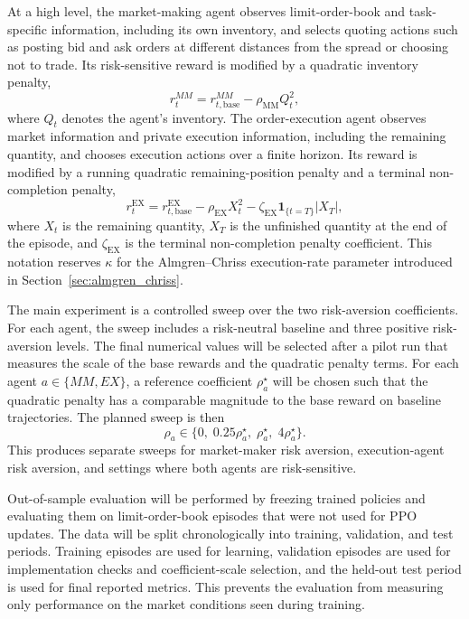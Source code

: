 \documentclass[oneside]{uva-inf-bachelor-thesis}
\begin{document}
At a high level, the market-making agent observes limit-order-book and task-specific information, including its own inventory, and selects quoting actions such as posting bid and ask orders at different distances from the spread or choosing not to trade. Its risk-sensitive reward is modified by a quadratic inventory penalty,
\[
r_t^{MM} = r_{t,\mathrm{base}}^{MM} - \rho_{\mathrm{MM}} Q_t^2,
\]
where \(Q_t\) denotes the agent's inventory. The order-execution agent observes market information and private execution information, including the remaining quantity, and chooses execution actions over a finite horizon. Its reward is modified by a running quadratic remaining-position penalty and a terminal non-completion penalty,
\[
r_t^{\mathrm{EX}}
=
r_{t,\mathrm{base}}^{\mathrm{EX}}
-
\rho_{\mathrm{EX}} X_t^2
-
\zeta_{\mathrm{EX}}\mathbf{1}_{\{t=T\}}|X_T|,
\]
where \(X_t\) is the remaining quantity, \(X_T\) is the unfinished quantity at the end of the episode, and \(\zeta_{\mathrm{EX}}\) is the terminal non-completion penalty coefficient. This notation reserves \(\kappa\) for the Almgren--Chriss execution-rate parameter introduced in Section~\ref{sec:almgren_chriss}.

The main experiment is a controlled sweep over the two risk-aversion coefficients. For each agent, the sweep includes a risk-neutral baseline and three positive risk-aversion levels. The final numerical values will be selected after a pilot run that measures the scale of the base rewards and the quadratic penalty terms. For each agent \(a \in \{MM, EX\}\), a reference coefficient \(\rho_a^\star\) will be chosen such that the quadratic penalty has a comparable magnitude to the base reward on baseline trajectories. The planned sweep is then
\[
\rho_a \in \{0,\;0.25\rho_a^\star,\;\rho_a^\star,\;4\rho_a^\star\}.
\]
This produces separate sweeps for market-maker risk aversion, execution-agent risk aversion, and settings where both agents are risk-sensitive.

Out-of-sample evaluation will be performed by freezing trained policies and evaluating them on limit-order-book episodes that were not used for PPO updates. The data will be split chronologically into training, validation, and test periods. Training episodes are used for learning, validation episodes are used for implementation checks and coefficient-scale selection, and the held-out test period is used for final reported metrics. This prevents the evaluation from measuring only performance on the market conditions seen during training.
\end{document}
